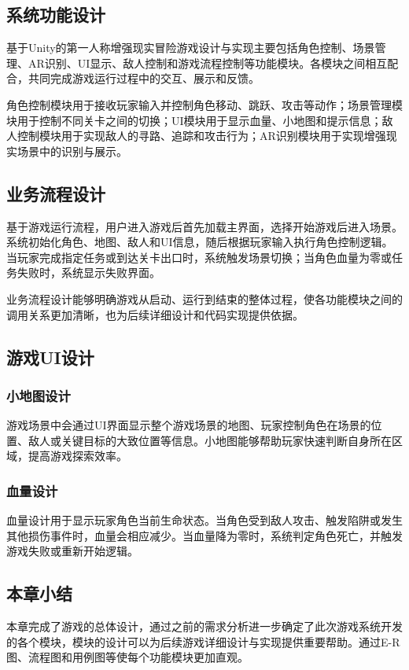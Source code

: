 \documentclass[12pt]{graduate-design-manual}
\begin{document}
\subsection{系统功能设计}
基于Unity的第一人称增强现实冒险游戏设计与实现主要包括角色控制、场景管理、AR识别、UI显示、敌人控制和游戏流程控制等功能模块。各模块之间相互配合，共同完成游戏运行过程中的交互、展示和反馈。

角色控制模块用于接收玩家输入并控制角色移动、跳跃、攻击等动作；场景管理模块用于控制不同关卡之间的切换；UI模块用于显示血量、小地图和提示信息；敌人控制模块用于实现敌人的寻路、追踪和攻击行为；AR识别模块用于实现增强现实场景中的识别与展示。

\subsection{业务流程设计}
基于游戏运行流程，用户进入游戏后首先加载主界面，选择开始游戏后进入场景。系统初始化角色、地图、敌人和UI信息，随后根据玩家输入执行角色控制逻辑。当玩家完成指定任务或到达关卡出口时，系统触发场景切换；当角色血量为零或任务失败时，系统显示失败界面。

业务流程设计能够明确游戏从启动、运行到结束的整体过程，使各功能模块之间的调用关系更加清晰，也为后续详细设计和代码实现提供依据。

\subsection{游戏UI设计}
\subsubsection{小地图设计}
游戏场景中会通过UI界面显示整个游戏场景的地图、玩家控制角色在场景的位置、敌人或关键目标的大致位置等信息。小地图能够帮助玩家快速判断自身所在区域，提高游戏探索效率。

\subsubsection{血量设计}
血量设计用于显示玩家角色当前生命状态。当角色受到敌人攻击、触发陷阱或发生其他损伤事件时，血量会相应减少。当血量降为零时，系统判定角色死亡，并触发游戏失败或重新开始逻辑。

\subsection{本章小结}
本章完成了游戏的总体设计，通过之前的需求分析进一步确定了此次游戏系统开发的各个模块，模块的设计可以为后续游戏详细设计与实现提供重要帮助。通过E-R图、流程图和用例图等使每个功能模块更加直观。
\end{document}
